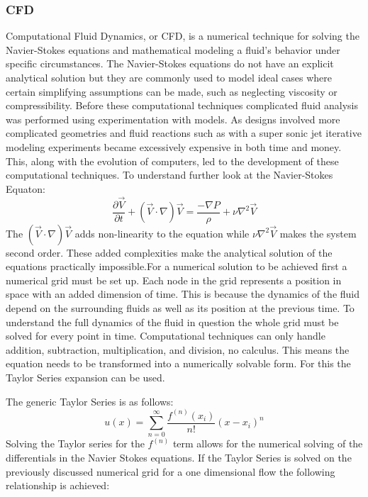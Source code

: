 \documentclass{report}
\begin{document}
\subsubsection{CFD}
Computational Fluid Dynamics, or CFD, is a numerical technique for solving the Navier-Stokes equations and mathematical modeling a fluid’s behavior under specific circumstances. The Navier-Stokes equations do not have an explicit analytical solution but they are commonly used to model ideal cases where certain simplifying assumptions can be made, such as neglecting viscosity or compressibility. Before these computational techniques complicated fluid analysis was performed using experimentation with models. As designs involved more complicated geometries and fluid reactions such as with a super sonic jet iterative modeling experiments became excessively expensive in both time and money.  This, along with the evolution of computers, led to the development of these computational techniques.
To understand further look at the Navier-Stokes Equaton:
\begin{equation}
\frac{\partial{\vec{V}}}{\partial{t}}+(\vec{V}\cdot\nabla)\vec{V}=\frac{-\nabla P}{\rho}+\nu\nabla^2\vec{V} 
\end{equation}
The $(\vec V\cdot\nabla)\vec V$ adds non-linearity to the equation while $\nu\nabla^2\vec{V}$ makes the system second order. These added complexities make the analytical solution of the equations practically impossible.For a numerical solution to be achieved first a numerical grid must be set up. Each node in the grid represents a position in space with an added dimension of time. This is because the dynamics of the fluid depend on the surrounding fluids as well as its position at the previous time. To understand the full dynamics of the fluid in question the whole grid must be solved for every point in time. Computational techniques can only handle addition, subtraction, multiplication, and division, no calculus. This means the equation needs to be transformed into a numerically solvable form. For this the Taylor Series expansion can be used.\par
The generic Taylor Series is as follows:
\begin{equation}
u(x)=\sum_{n=0}^{\infty}\frac{f^{(n)}(x_i)}{n!}(x-x_i)^n
\end{equation}
Solving the Taylor series for the $f^{(n)}$ term allows for the numerical solving of the differentials in the Navier Stokes equations. If the Taylor Series is solved on the previously discussed numerical grid for a one dimensional flow the following relationship is achieved:
\end{document}
